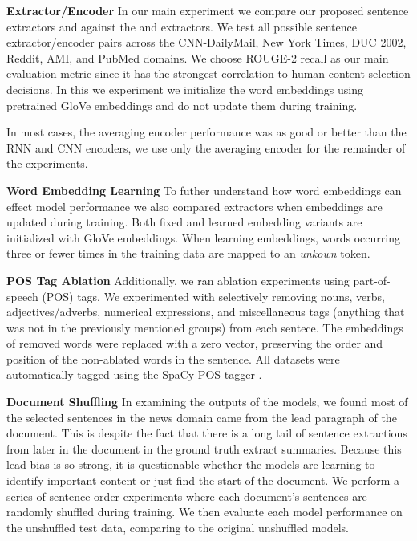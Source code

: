 \textbf{Extractor/Encoder} In our main experiment we compare our proposed 
sentence extractors \modelOneBF
and \modelTwoBF against the \baselineOneBF and \baselineTwoBF extractors.
We test all possible sentence extractor/encoder pairs across the CNN-DailyMail,
New York Times, DUC 2002, Reddit, AMI, and PubMed domains. We choose ROUGE-2
recall as our main evaluation metric since it has the strongest correlation
to human content selection decisions. In this we experiment we initialize
the word embeddings using pretrained GloVe embeddings \cite{glove} and do 
not update them during training.

In most cases, the averaging encoder performance was as good or better than
the RNN and CNN encoders, we use only the averaging encoder for the remainder
of the experiments.

\textbf{Word Embedding Learning} To futher understand how word 
embeddings 
can
effect model performance we also compared extractors when embeddings 
are updated during training. Both fixed and learned embedding variants are 
initialized with GloVe embeddings. When learning embeddings, words occurring 
three or fewer times in the training data are mapped to an \textit{unkown}
token.

\textbf{POS Tag Ablation} Additionally, we ran ablation experiments
using part-of-speech (POS) tags. We experimented with selectively removing 
nouns, verbs, adjectives/adverbs, numerical expressions, and miscellaneous
tags (anything that was not in the previously mentioned groups) from each sentece. The embeddings of removed words were replaced with a zero vector,
preserving the order and position of the non-ablated words in the sentence.
All datasets were automatically tagged using
the SpaCy POS tagger \cite{spacy}.   


\textbf{Document Shuffling} In examining the outputs of the models, we found
most of the selected sentences in the news domain came from the lead paragraph
of the document. This is despite the fact that there is a long tail of 
sentence extractions from later in the document in the ground truth extract 
summaries. Because this lead bias is so strong, it is questionable whether
the models are learning to identify important content or just find the start
of the document. We perform a series of sentence order experiments where 
each document's sentences are randomly shuffled during training. We then
evaluate each model performance on the unshuffled test data, comparing to 
the original unshuffled models. 

